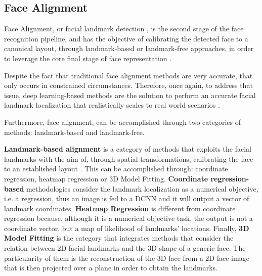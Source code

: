 \documentclass[class=report, crop=false, a4paper, 12pt]{standalone}
\begin{document}
\subsection{Face Alignment}
\par Face Alignment, or facial landmark detection \autocite{changFacePoseNetMakingCase2017}, is the second stage of the face recognition pipeline, and has the objective of calibrating the detected face to a canonical layout, through landmark-based or landmark-free approaches, in order to leverage the core final stage of face representation \autocite{duElementsEndtoendDeep2022}. 
\par Despite the fact that traditional face alignment methods are very accurate, that only occurs in constrained circumstances. Therefore, once again, to address that issue, deep learning-based methods are the solution to perform an accurate facial landmark localization that realistically scales to real world scenarios \autocite{fengWingLossRobust2018}. 
\par Furthermore, face alignment, can be accomplished through two categories of methods: landmark-based and landmark-free.

\vspace{0.7\baselineskip}
\par \noindent \textbf{Landmark-based alignment} is a category of methods that exploits the facial landmarks with the aim of, through spatial transformations, calibrating the face to an established layout \autocite{duElementsEndtoendDeep2022}. This can be accomplished through: coordinate regression, heatmap regression or 3D Model Fitting. \textbf{Coordinate regression-based} methodologies \autocite{fengWingLossRobust2018,liuTwoStreamTransformerNetworks2018,zhangJointFaceDetection2016a} consider the landmark localization as a numerical objective, i.e. a regression, thus an image is fed to a DCNN and it will output a vector of landmark coordinates. \textbf{Heatmap Regression} \autocite{dengJointMultiviewFace2017,wuLookBoundaryBoundaryAware2018,chenFaceAlignmentKernel2019} is different from coordinate regression because, although it is a numerical objective task, the output is not a coordinate vector, but a map of likelihood of landmarks' locations. Finally, \textbf{3D Model Fitting} \autocite{bhagavatulaFasterRealtimeFacial2017,changFacePoseNetMakingCase2017,xiaoRecurrent3D2DDual2017}is the category that integrates methods that consider the relation between 2D facial landmarks and the 3D shape of a generic face. The particularity of them is the reconstruction of the 3D face from a 2D face image that is then projected over a plane in order to obtain the landmarks. 
\end{document}
